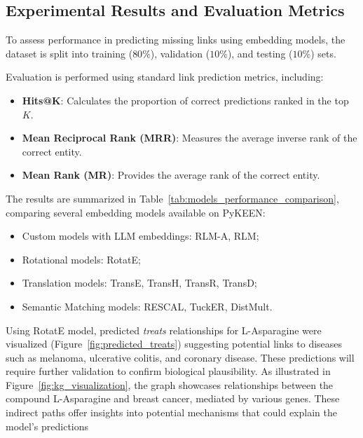 \subsection*{Experimental Results and Evaluation Metrics}

To assess performance in predicting missing links using embedding models, the dataset is split into training ($80\%$), validation ($10\%$), and testing ($10\%$) sets.

Evaluation is performed using standard link prediction metrics, including:

\begin{itemize}
    \item \textbf{Hits@K}: Calculates the proportion of correct predictions ranked in the top $K$. %
    \item \textbf{Mean Reciprocal Rank (MRR)}: Measures the average inverse rank of the correct entity. %
    \item \textbf{Mean Rank (MR)}: Provides the average rank of the correct entity. %
\end{itemize}

The results are summarized in Table~\ref{tab:models_performance_comparison}, comparing several embedding models available on PyKEEN:
\begin{itemize}
    \item Custom models with LLM embeddings: RLM-A, RLM;
    \item Rotational models: RotatE;
    \item Translation models: TransE, TransH, TransR, TransD;
    \item Semantic Matching models: RESCAL, TuckER, DistMult.
\end{itemize}

Using RotatE model, predicted \textit{treats} relationships for L-Asparagine were visualized (Figure~\ref{fig:predicted_treats}) suggesting potential links to diseases such as melanoma, ulcerative colitis, and coronary disease. These predictions will require further validation to confirm biological plausibility. As illustrated in Figure~\ref{fig:kg_visualization}, the graph showcases relationships between the compound L-Asparagine and breast cancer, mediated by various genes. These indirect paths offer insights into potential mechanisms that could explain the model's predictions

